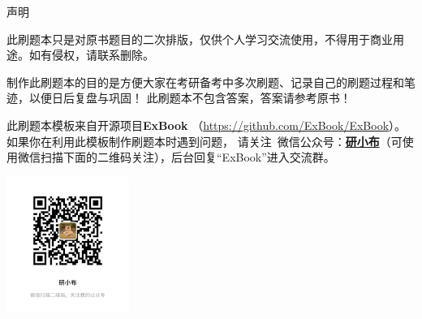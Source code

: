 \clearpage
\vspace*{-5mm} 
\begin{center}
    \large \heiti 声明
\end{center}

\hspace*{2em}此刷题本只是对原书题目的二次排版，仅供个人学习交流使用，不得用于商业用途。如有侵权，请联系删除。

\hspace*{2em}制作此刷题本的目的是方便大家在考研备考中多次刷题、记录自己的刷题过程和笔迹，以便日后复盘与巩固！
此刷题本不包含答案，答案请参考原书！

\hspace*{2em}此刷题本模板来自开源项目\textbf{ExBook} （\url{https://github.com/ExBook/ExBook}）。如果你在利用此模板制作刷题本时遇到问题，
请关注 \faWeixin \,微信公众号：\underline{\textbf{研小布}}（可使用微信扫描下面的二维码关注），后台回复“ExBook”进入交流群。


\begin{minipage}[t]{1.0\textwidth}
    \centering
    \includegraphics[width=0.30\textwidth]{img/qr01.jpg} 
\end{minipage}
\clearpage
